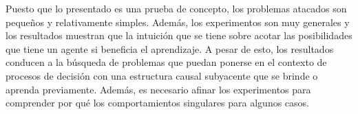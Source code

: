 Puesto que lo presentado es una prueba de concepto, los problemas atacados
son pequeños y relativamente simples. Además, los experimentos son muy generales y los resultados muestran  que la intuición que se tiene sobre acotar las posibilidades que tiene un agente si beneficia el aprendizaje.
A pesar de esto, los resultados conducen a la búsqueda
de problemas que puedan ponerse en el contexto de procesos de decisión
con una estructura causal subyacente que se brinde o aprenda previamente. Además,
es necesario afinar los experimentos para comprender por qué los comportamientos singulares para algunos casos.

